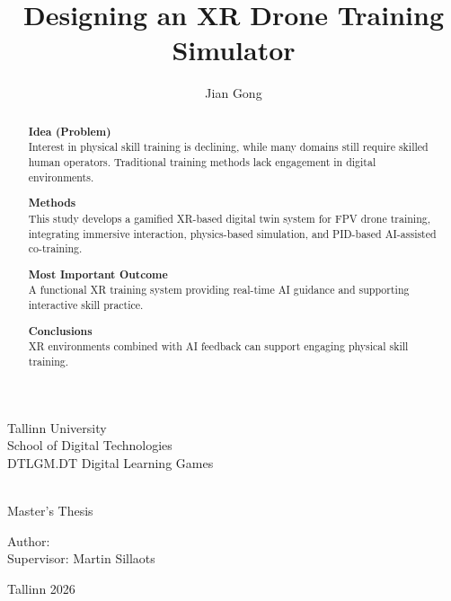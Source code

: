 \documentclass[12pt]{article}
\title{Designing an XR Drone Training Simulator}
\author{Jian Gong}
\begin{document}
\begin{titlepage}
\makeatletter
    \centering
    \vspace{2cm}
    {\large Tallinn University}\\
    \vspace{0.5cm}
    {\large School of Digital Technologies} \\
    \vspace{0.5cm}
    {\large DTLGM.DT Digital Learning Games}

    \vfill

    {\huge \textbf{ \@title }}\\
    \vspace{2cm}
    {\large Master's Thesis}

    \vfill
    \vfill

    \begin{flushright}
        {\large Author: \@author} \\
        \vspace{0.3cm}
        {\large Supervisor: Martin Sillaots}
    \end{flushright}

    \vfill

    {\large Tallinn 2026}
\makeatother
\end{titlepage}



\newpage
\begin{abstract}

\textbf{Idea (Problem)} \\
Interest in physical skill training is declining, while many domains still require skilled human operators. Traditional training methods lack engagement in digital environments.

\textbf{Methods} \\
This study develops a gamified XR-based digital twin system for FPV drone training, integrating immersive interaction, physics-based simulation, and PID-based AI-assisted co-training.

\textbf{Most Important Outcome} \\
A functional XR training system providing real-time AI guidance and supporting interactive skill practice.

\textbf{Conclusions} \\
XR environments combined with AI feedback can support engaging physical skill training.

\end{abstract}
\end{document}
